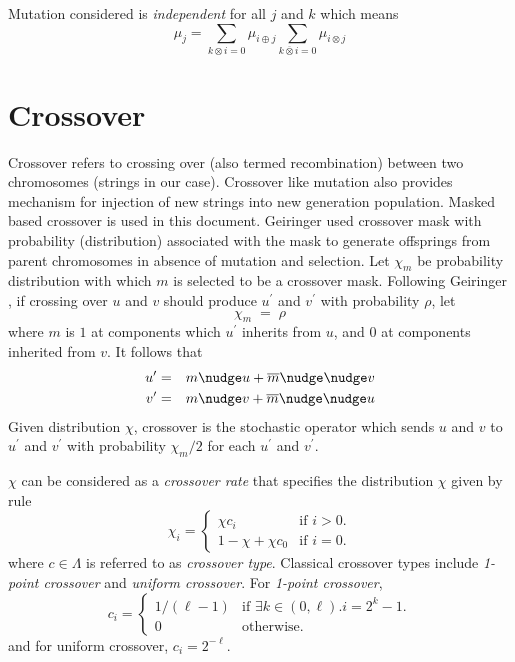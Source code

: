 Mutation considered is {\em independent} for all $j$ and $k$ which means \cite{VoseWright1998}
\[
\mu_j = \sum\limits_{k\otimes i=0} \mu_{i\oplus j} \sum\limits_{k\overline \otimes i=0} \mu_{i\otimes j}
\]

\section{Crossover}
Crossover refers to crossing over (also termed recombination) between two chromosomes (strings in our case). Crossover like mutation also provides mechanism for injection of new strings into new generation population. Masked based crossover is used in this document. Geiringer \cite{Geiringer1944} used crossover mask with probability (distribution) associated with the mask to generate offsprings from parent chromosomes in absence of mutation and selection. Let $\chi_m$ be probability distribution with which $m$ is selected to be a crossover mask.
Following Geiringer \cite{Geiringer1944}, if crossing over $u$ and $v$ should produce $u^\prime$ and $v^\prime$ with probability $\rho$, let
\[
\chi_m \; = \; \rho
\]
where $m$ is $1$ at components which $u^\prime$ inherits from $u$, and
$0$ at components inherited from $v$.  It follows that\\[-0.3in]
\begin{eqnarray*}
u^\prime & = & m \nudge u + \overline{m} \nudge\nudge v \\
v^\prime & = & m \nudge v + \overline{m} \nudge\nudge u
\end{eqnarray*}
Given distribution $\chi$, crossover is the stochastic operator which
sends $u$ and $v$ to $u^\prime$ and $v^\prime$ with probability $\chi_m/2$ for each $u^\prime$ and $v^\prime$.

$\chi$ can be considered as a {\em crossover rate} that specifies the distribution $\chi$ given by rule \cite{VoseWright1998}
\[
  \chi_i =\begin{cases}
    \chi  c_i & \text{if $i>0$}.\\
    1 - \chi + \chi  c_0 & \text{if $i = 0$}.
  \end{cases}
\]
where $c \in \Lambda$ is referred to as {\em crossover type}. Classical crossover types include {\em 1-point crossover} and {\em uniform crossover}. For {\em 1-point crossover},
\[
  c_i =\begin{cases}
    1/(\ell - 1) & \text{if $\exists k \in (0, \ell).i = 2^k - 1$}.\\
    0 & \text{otherwise}.
  \end{cases}
\]
and for uniform crossover, $c_i = 2^{-\ell}$.

